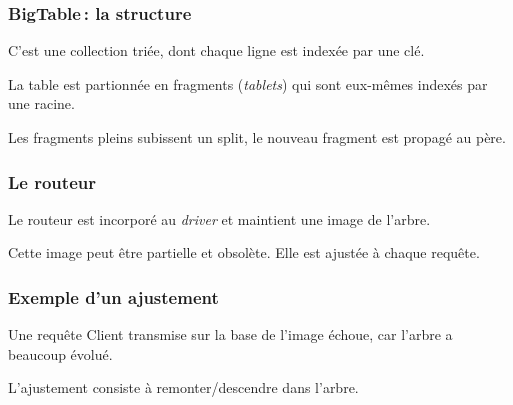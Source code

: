 \begin{frame}
\frametitle{BigTable\,: la structure} 

C'est une collection \alert{triée}, dont chaque ligne est indexée par une clé.


 
La table est partionnée en fragments (\textit{tablets}) qui sont eux-mêmes indexés 
par une racine. 

\vfill

Les fragments pleins subissent un \alert{split}, le nouveau fragment est propagé 
au père.


\end{frame}
 

\begin{frame}
\frametitle{Le routeur}

Le routeur est incorporé au \textit{driver} et maintient une \alert{image} de l'arbre.



Cette image peut être \alert{partielle} et \alert{obsolète}. Elle est \alert{ajustée}
à chaque requête.

\end{frame}
 
\begin{frame}
\frametitle{Exemple d'un ajustement}

Une requête Client transmise sur la base de l'image échoue, car l'arbre a 
beaucoup évolué.


L'ajustement consiste à remonter/descendre dans l'arbre.

\end{frame}

